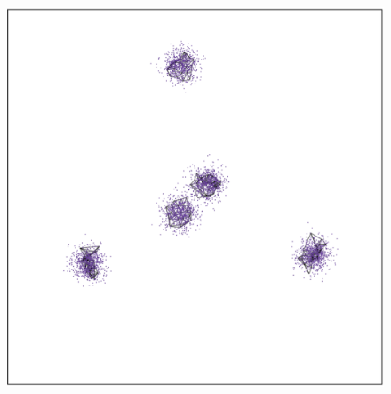 \documentclass[
  12pt]{article}
\begin{document}
\begin{figure}[H]
\begin{minipage}[t]{0.33\linewidth}
{{\includegraphics{figures/five_gau_clusters/sc_trimap_2.png}

}

}

\subcaption{\label{fig-gau4_sc2}}
\end{minipage}%
%
\begin{minipage}[t]{0.33\linewidth}

{\centering 

}
\end{minipage}
\end{figure}
\end{document}
